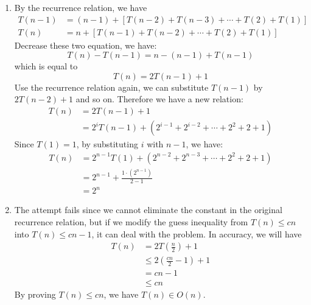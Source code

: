 \documentclass[a4paper,12pt]{article}
\begin{document}
\begin{enumerate}
\item {
By the recurrence relation, we have
\[
\begin{split}
    T(n-1) & = (n-1) + [T(n-2) + T(n-3) + \cdots + T(2) + T(1)] \\
    T(n) & = n + [T(n-1) + T(n-2) + \cdots + T(2) + T(1)]
\end{split}
\]
Decrease these two equation, we have:
\[
T(n)-T(n-1)=n-(n-1)+T(n-1)
\]
which is equal to
\[
T(n) = 2T(n-1)+1
\]
Use the recurrence relation again, we can substitute $T(n-1)$ by $2T(n-2)+1$ and so on. Therefore we have a new relation:
\[
\begin{split}
    T(n) & = 2T(n-1)+1 \\
    & = 2^iT(n-1) + (2^{i-1} + 2^{i-2} + \cdots + 2^2 + 2 + 1)
\end{split}
\]
Since $T(1) = 1$, by substituting $i$ with $n-1$, we have:
\[
\begin{split}
    T(n) & = 2^{n-1}T(1) + (2^{n-2} + 2^{n-3} + \cdots + 2^2 + 2 + 1) \\
    & = 2^{n-1} + \frac{1\cdot (2^{n-1})}{2-1} \\
    & = 2^n
\end{split}
\]

}

\item{
The attempt fails since we cannot eliminate the constant in the original recurrence relation, but if we modify the guess inequality from $T(n)\leq cn$ into $T(n) \leq cn - 1$, it can deal with the problem. In accuracy, we will have
\[
\begin{split}
    T(n) & = 2T(\frac{n}{2}) + 1 \\
    & \leq 2(\frac{cn}{2} - 1) + 1 \\
    & = cn - 1 \\
    & \leq cn
\end{split}
\]
By proving $T(n) \leq cn$, we have $T(n) \in O(n)$.
}


\end{enumerate}
\end{document}
